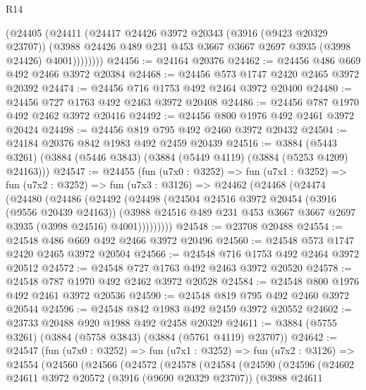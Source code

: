\begin{lexlean}{R14}
\begin{coremodule}
            (@24405
              (@24411
                (@24417
                  @24426
                  @3972
                  @20343
                  (@3916 (@9423 @20329 @23707))
                  (@3988 @24426 @489 @231 @453 @3667 @3667 @2697 @3935 (@3998 @24426) @4001))))))))
@24456 := @24164 @20376
@24462 := @24456 @486 @669 @492 @2466 @3972 @20384
@24468 := @24456 @573 @1747 @2420 @2465 @3972 @20392
@24474 := @24456 @716 @1753 @492 @2464 @3972 @20400
@24480 := @24456 @727 @1763 @492 @2463 @3972 @20408
@24486 := @24456 @787 @1970 @492 @2462 @3972 @20416
@24492 := @24456 @800 @1976 @492 @2461 @3972 @20424
@24498 := @24456 @819 @795 @492 @2460 @3972 @20432
@24504 := @24184 @20376 @842 @1983 @492 @2459 @20439
@24516 := @3884
    (@5443 @3261)
    (@3884 (@5446 @3843) (@3884 (@5449 @4119) (@3884 (@5253 @4209) @24163)))
@24547 := @24455
    (fun (u7x0 : @3252) =>
    fun (u7x1 : @3252) =>
    fun (u7x2 : @3252) =>
    fun (u7x3 : @3126) =>
    @24462
      (@24468
        (@24474
          (@24480
            (@24486
              (@24492
                (@24498
                  (@24504
                    @24516
                    @3972
                    @20454
                    (@3916 (@9556 @20439 @24163))
                    (@3988
                      @24516
                      @489
                      @231
                      @453
                      @3667
                      @3667
                      @2697
                      @3935
                      (@3998 @24516)
                      @4001)))))))))
@24548 := @23708 @20488
@24554 := @24548 @486 @669 @492 @2466 @3972 @20496
@24560 := @24548 @573 @1747 @2420 @2465 @3972 @20504
@24566 := @24548 @716 @1753 @492 @2464 @3972 @20512
@24572 := @24548 @727 @1763 @492 @2463 @3972 @20520
@24578 := @24548 @787 @1970 @492 @2462 @3972 @20528
@24584 := @24548 @800 @1976 @492 @2461 @3972 @20536
@24590 := @24548 @819 @795 @492 @2460 @3972 @20544
@24596 := @24548 @842 @1983 @492 @2459 @3972 @20552
@24602 := @23733 @20488 @920 @1988 @492 @2458 @20329
@24611 := @3884 (@5755 @3261) (@3884 (@5758 @3843) (@3884 (@5761 @4119) @23707))
@24642 := @24547
    (fun (u7x0 : @3252) =>
    fun (u7x1 : @3252) =>
    fun (u7x2 : @3126) =>
    @24554
      (@24560
        (@24566
          (@24572
            (@24578
              (@24584
                (@24590
                  (@24596
                    (@24602
                      @24611
                      @3972
                      @20572
                      (@3916 (@9690 @20329 @23707))
                      (@3988
                        @24611

\end{coremodule}
\end{lexlean}
